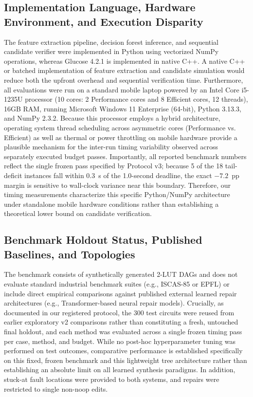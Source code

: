 \documentclass[11pt,a4paper]{article}
\begin{document}
\subsection{Implementation Language, Hardware Environment, and Execution Disparity}
The feature extraction pipeline, decision forest inference, and sequential candidate verifier were implemented in Python using vectorized NumPy operations, whereas Glucose 4.2.1 is implemented in native C++. A native C++ or batched implementation of feature extraction and candidate simulation would reduce both the upfront overhead and sequential verification time. Furthermore, all evaluations were run on a standard mobile laptop powered by an Intel Core i5-1235U processor (10 cores: 2 Performance cores and 8 Efficient cores, 12 threads), 16GB RAM, running Microsoft Windows 11 Enterprise (64-bit), Python 3.13.3, and NumPy 2.3.2. Because this processor employs a hybrid architecture, operating system thread scheduling across asymmetric cores (Performance vs. Efficient) as well as thermal or power throttling on mobile hardware provide a plausible mechanism for the inter-run timing variability observed across separately executed budget passes. Importantly, all reported benchmark numbers reflect the single frozen pass specified by Protocol v3; because 5 of the 18 tail-deficit instances fall within 0.3~s of the 1.0-second deadline, the exact $-7.2$~pp margin is sensitive to wall-clock variance near this boundary. Therefore, our timing measurements characterize this specific Python/NumPy architecture under standalone mobile hardware conditions rather than establishing a theoretical lower bound on candidate verification.

\subsection{Benchmark Holdout Status, Published Baselines, and Topologies}
The benchmark consists of synthetically generated 2-LUT DAGs and does not evaluate standard industrial benchmark suites (e.g., ISCAS-85 or EPFL) or include direct empirical comparisons against published external learned repair architectures (e.g., Transformer-based neural repair models). Crucially, as documented in our registered protocol, the 300 test circuits were reused from earlier exploratory v2 comparisons rather than constituting a fresh, untouched final holdout, and each method was evaluated across a single frozen timing pass per case, method, and budget. While no post-hoc hyperparameter tuning was performed on test outcomes, comparative performance is established specifically on this fixed, frozen benchmark and this lightweight tree architecture rather than establishing an absolute limit on all learned synthesis paradigms. In addition, stuck-at fault locations were provided to both systems, and repairs were restricted to single non-noop edits.
\end{document}
